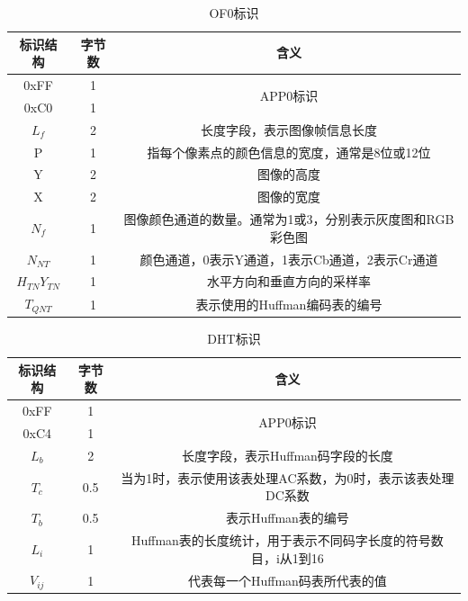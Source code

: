 \documentclass{article}
\numberwithin {equation}{section}
\begin{document}
\begin{spacing}{1.25}
    \begin{table}[H]
      \centering
      \caption{OF0标识}
      \begin{tabular}{ccc}
        \toprule
        标识结构 & 字节数 & 含义\\
        \midrule
        0xFF & 1 & \multirow{2}{*}{APP0标识}\\
        0xC0 & 1 &\\
        $L_{f}$ & 2 & 长度字段，表示图像帧信息长度\\
        P & 1 & 指每个像素点的颜色信息的宽度，通常是8位或12位\\
        Y & 2 & 图像的高度\\
        X & 2 & 图像的宽度\\
        $N_{f}$ & 1 & 图像颜色通道的数量。通常为1或3，分别表示灰度图和RGB彩色图\\
        $N_{NT}$ & 1 & 颜色通道，0表示Y通道，1表示Cb通道，2表示Cr通道\\
        $H_{TN}Y_{TN}$ & 1 & 水平方向和垂直方向的采样率\\
        $T_{QNT}$ & 1 & 表示使用的Huffman编码表的编号\\
        \bottomrule
      \end{tabular}
    \end{table}

    \begin{table}[H]
      \centering
      \caption{DHT标识}
      \begin{tabular}{ccc}
        \toprule
        标识结构 & 字节数 & 含义\\
        \midrule
        0xFF & 1 & \multirow{2}{*}{APP0标识}\\
        0xC4 & 1 &\\
        $L_{b}$ & 2 & 长度字段，表示Huffman码字段的长度\\
        $T_{c}$ & 0.5 & 当为1时，表示使用该表处理AC系数，为0时，表示该表处理DC系数\\
        $T_{b}$ & 0.5 & 表示Huffman表的编号\\
        $L_{i}$ & 1 & Huffman表的长度统计，用于表示不同码字长度的符号数目，i从1到16\\
        $V_{ij}$ & 1 & 代表每一个Huffman码表所代表的值\\
        \bottomrule
      \end{tabular}
    \end{table}


\end{spacing}
\end{document}
